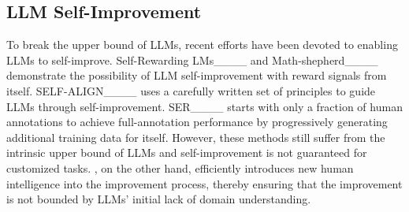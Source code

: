     
\vspace{-0.1in}
\subsection{LLM Self-Improvement}
\vspace{-0.05in}

To break the upper bound of LLMs, recent efforts have been devoted to enabling LLMs to self-improve. Self-Rewarding LMs____ and Math-shepherd____ demonstrate the possibility of LLM self-improvement with reward signals from itself. SELF-ALIGN____ uses a carefully written set of principles to guide LLMs through self-improvement. SER____ starts with only a fraction of human annotations to achieve full-annotation performance by progressively generating additional training data for itself. 
However, these methods still suffer from the intrinsic upper bound of LLMs and self-improvement is not guaranteed for customized tasks.
\myname{}, on the other hand, efficiently introduces new human intelligence into the improvement process, thereby ensuring that the improvement is not bounded by LLMs' initial lack of domain understanding.

